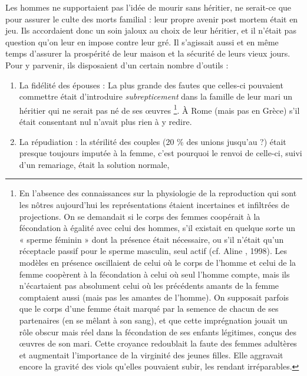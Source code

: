 Les hommes ne supportaient pas l'idée de mourir sans héritier, ne
serait-ce que pour assurer le culte des morts familial : leur propre avenir
post mortem était en jeu. Ils accordaient donc un soin jaloux au choix de
leur héritier, et il n'était pas question qu'on leur en impose contre leur
gré. Il s'agissait aussi et en même temps d'assurer la prospérité de leur
maison et la sécurité de leurs vieux jours. Pour y parvenir, ils disposaient
d'un certain nombre d'outils :

\begin{enumerate}
\item La fidélité des épouses : La plus grande des fautes que celles-ci%
pouvaient commettre était d'introduire \emph{subrepticement} dans la famille de
leur mari un héritier qui ne serait pas né de ses œuvres%
\footnote{En l'absence des connaissances sur la physiologie de la reproduction qui sont les nôtres aujourd'hui les représentations étaient incertaines et infiltrées de projections. On se demandait si le corps des femmes coopérait à la 
fécondation à égalité avec celui des hommes, s'il existait en quelque sorte un « sperme féminin » dont la présence 
était nécessaire, ou s'il n'était qu'un réceptacle passif pour le sperme masculin, seul actif (cf. Aline , 
1998). Les modèles en présence oscillaient de celui où le corps de l'homme et celui de la femme coopèrent à la fécondation à celui où seul l'homme compte, mais ils n'écartaient pas absolument celui où les précédents amants de 
la femme comptaient aussi (mais pas les amantes de l'homme). On supposait parfois que le corps d'une femme 
était marqué par la semence de chacun de ses partenaires (en se mêlant à son sang), et que cette imprégnation jouait
un rôle obscur mais réel
dans la fécondation de ses
enfants légitimes,
conçus des œuvres
de son mari. Cette 
croyance redoublait la faute des femmes adultères et augmentait l'importance de la virginité des jeunes filles. Elle 
aggravait encore la gravité des viols qu'elles pouvaient subir, les rendant irréparables.}.
À Rome (mais pas en Grèce) s'il était consentant nul n'avait plus rien à y redire.
\item La répudiation : la stérilité des couples (20 \% des unions jusqu'au
 ?) était presque toujours imputée à la femme, c'est
pourquoi le renvoi de celle-ci, suivi d'un remariage, était la solution normale,

\end{enumerate}
